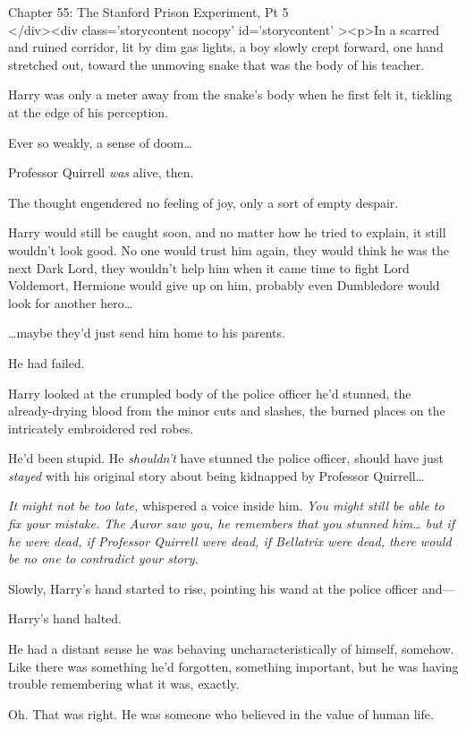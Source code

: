 
Chapter 55: The Stanford Prison Experiment, Pt 5\\
</div><div  class='storycontent nocopy' id='storycontent' ><p>In a scarred and 
ruined corridor, lit by dim gas lights, a boy slowly crept forward, one hand 
stretched out, toward the unmoving snake that was the body of his teacher.

Harry was only a meter away from the snake's body when he first felt it, 
tickling at the edge of his perception.

Ever so weakly, a sense of doom{\ldots}

Professor Quirrell \emph{was} alive, then.

The thought engendered no feeling of joy, only a sort of empty despair.

Harry would still be caught soon, and no matter how he tried to explain, it 
still wouldn't look good. No one would trust him again, they would think he was 
the next Dark Lord, they wouldn't help him when it came time to fight Lord 
Voldemort, Hermione would give up on him, probably even Dumbledore would look 
for another hero{\ldots}

{\ldots}maybe they'd just send him home to his parents.

He had failed.

Harry looked at the crumpled body of the police officer he'd stunned, the 
already-drying blood from the minor cuts and slashes, the burned places on the 
intricately embroidered red robes.

He'd been stupid. He \emph{shouldn't} have stunned the police officer, should 
have just \emph{stayed} with his original story about being kidnapped by 
Professor Quirrell{\ldots}

\emph{It might not be too late,} whispered a voice inside him. \emph{You might 
still be able to fix your mistake. The Auror saw you, he remembers that you 
stunned him{\ldots} but if he were dead, if Professor Quirrell were dead, if 
Bellatrix were dead, there would be no one to contradict your story.}

Slowly, Harry's hand started to rise, pointing his wand at the police officer 
and---

Harry's hand halted.

He had a distant sense he was behaving uncharacteristically of himself, 
somehow. Like there was something he'd forgotten, something important, but he 
was having trouble remembering what it was, exactly.

Oh. That was right. He was someone who believed in the value of human life.

